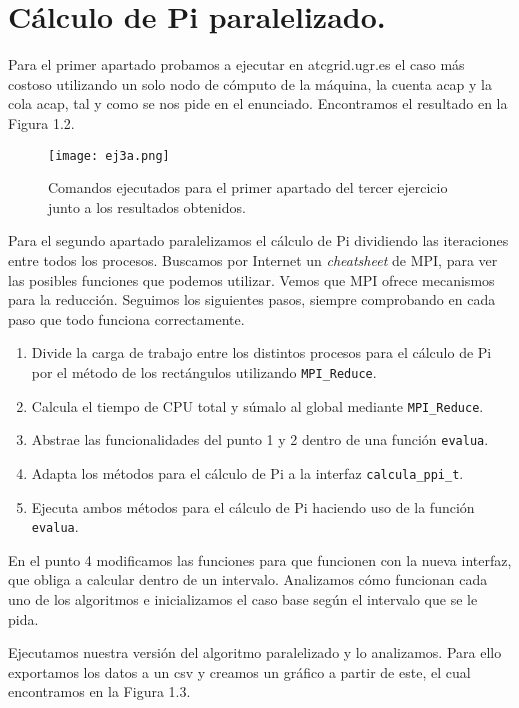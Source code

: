 \section{Cálculo de Pi paralelizado.}

Para el primer apartado probamos a ejecutar en atcgrid.ugr.es el caso más costoso utilizando un solo nodo de cómputo de la máquina, la cuenta acap y la cola acap,
tal y como se nos pide en el enunciado.
Encontramos el resultado en la Figura 1.2.

\begin{figure}[H]
    \centering
    \texttt{[image: ej3a.png]}
    \caption{Comandos ejecutados para el primer apartado del tercer ejercicio junto a los resultados obtenidos.}
\end{figure}

Para el segundo apartado paralelizamos el cálculo de Pi dividiendo las iteraciones entre todos los procesos.
Buscamos por Internet un \textit{cheatsheet} de MPI, para ver las posibles funciones que podemos utilizar. Vemos que
MPI ofrece mecanismos para la reducción. Seguimos los siguientes pasos, siempre comprobando en cada paso que todo
funciona correctamente.

\begin{enumerate}
    \item Divide la carga de trabajo entre los distintos procesos para el cálculo de Pi por el método de los rectángulos utilizando \texttt{MPI\_Reduce}.
    \item Calcula el tiempo de CPU total y súmalo al global mediante \texttt{MPI\_Reduce}.
    \item Abstrae las funcionalidades del punto 1 y 2 dentro de una función \texttt{evalua}.
    \item Adapta los métodos para el cálculo de Pi a la interfaz \texttt{calcula\_ppi\_t}.
    \item Ejecuta ambos métodos para el cálculo de Pi haciendo uso de la función \texttt{evalua}. 
\end{enumerate}

En el punto 4 modificamos las funciones para que funcionen con la nueva interfaz, que obliga a calcular
dentro de un intervalo. Analizamos cómo funcionan cada uno de los algoritmos e inicializamos el caso base según
el intervalo que se le pida.

\pagebreak

Ejecutamos nuestra versión del algoritmo paralelizado y lo analizamos. Para ello exportamos los datos a un csv y
creamos un gráfico a partir de este, el cual encontramos en la Figura 1.3.

